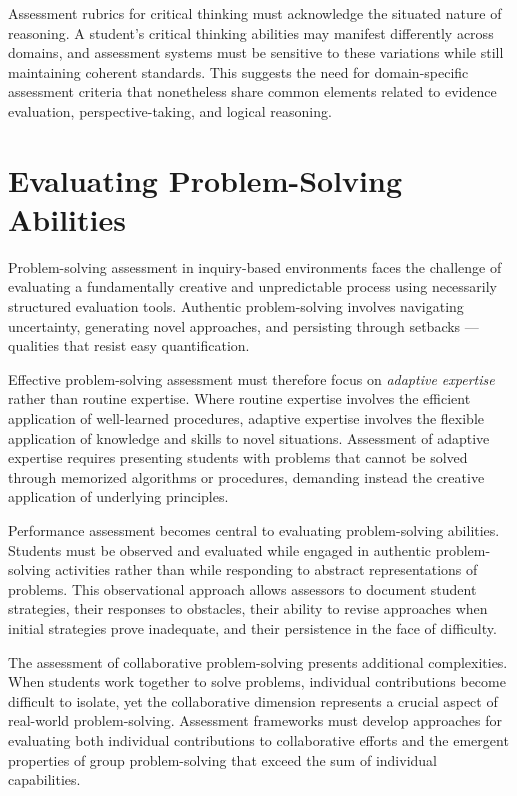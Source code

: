 \documentclass[
  Letterpaper,
]{scrbook}
\begin{document}
Assessment rubrics for critical thinking must acknowledge the situated
nature of reasoning. A student's critical thinking abilities may
manifest differently across domains, and assessment systems must be
sensitive to these variations while still maintaining coherent
standards. This suggests the need for domain-specific assessment
criteria that nonetheless share common elements related to evidence
evaluation, perspective-taking, and logical reasoning.

\section{Evaluating Problem-Solving
Abilities}\label{evaluating-problem-solving-abilities}

Problem-solving assessment in inquiry-based environments faces the
challenge of evaluating a fundamentally creative and unpredictable
process using necessarily structured evaluation tools. Authentic
problem-solving involves navigating uncertainty, generating novel
approaches, and persisting through setbacks --- qualities that resist
easy quantification.

Effective problem-solving assessment must therefore focus on
\emph{adaptive expertise} rather than routine expertise. Where routine
expertise involves the efficient application of well-learned procedures,
adaptive expertise involves the flexible application of knowledge and
skills to novel situations. Assessment of adaptive expertise requires
presenting students with problems that cannot be solved through
memorized algorithms or procedures, demanding instead the creative
application of underlying principles.

Performance assessment becomes central to evaluating problem-solving
abilities. Students must be observed and evaluated while engaged in
authentic problem-solving activities rather than while responding to
abstract representations of problems. This observational approach allows
assessors to document student strategies, their responses to obstacles,
their ability to revise approaches when initial strategies prove
inadequate, and their persistence in the face of difficulty.

The assessment of collaborative problem-solving presents additional
complexities. When students work together to solve problems, individual
contributions become difficult to isolate, yet the collaborative
dimension represents a crucial aspect of real-world problem-solving.
Assessment frameworks must develop approaches for evaluating both
individual contributions to collaborative efforts and the emergent
properties of group problem-solving that exceed the sum of individual
capabilities.
\end{document}
